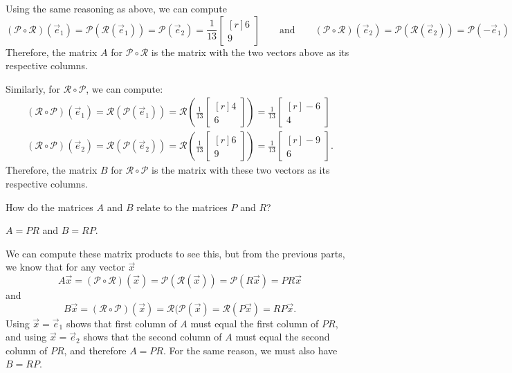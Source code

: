 \documentclass{problemset}
\newcommand{\xhat}{{\vec e_1}}
\newcommand{\yhat}{{\vec e_2}}
\newcommand{\mat}[1]{\begin{bmatrix*}[r]#1\end{bmatrix*}}
\begin{document}
\begin{parts}
\begin{solution}
				Using the same reasoning as above, we can compute
				\[
					(\mathcal P\circ\mathcal R)(\xhat)
					=\mathcal P(\mathcal R(\xhat))
					=\mathcal P(\yhat)
					=\frac{1}{13}\mat{6\\9}
					\qquad \text{and} \qquad
					(\mathcal P\circ\mathcal R)(\yhat)
					=\mathcal P(\mathcal R(\yhat))
					=\mathcal P(-\xhat)
					=\frac{1}{13}\mat{-4\\-6}.
				\]
				Therefore, the matrix $A$ for $\mathcal P\circ\mathcal R$ is the
				matrix with the two vectors above as its respective columns.

				Similarly, for $\mathcal R\circ \mathcal P$, we can compute:
				\begin{gather*}
					(\mathcal R\circ\mathcal P)(\xhat)
					=\mathcal R(\mathcal P(\xhat))
					=\mathcal R\left(\frac{1}{13}\mat{4\\6}\right)
					=\frac{1}{13}\mat{-6\\4} \\
					(\mathcal R\circ\mathcal P)(\yhat)
					=\mathcal R(\mathcal P(\yhat))
					=\mathcal R\left(\frac{1}{13}\mat{6\\9}\right)
					=\frac{1}{13}\mat{-9\\6}.
				\end{gather*}
				Therefore, the matrix $B$ for $\mathcal R\circ\mathcal P$ is the
				matrix with these two vectors as its respective columns.
			\end{solution}
		\item How do the matrices $A$ and $B$ relate to the matrices $P$ and $R$?
			\begin{solution}
				$A = PR$ and $B = RP$.

				We can compute these matrix products to see this, but
				from the previous parts, we know that for any vector $\vec x$
				\[
					A\vec x
					=(\mathcal P\circ\mathcal R)(\vec x)
					=\mathcal P(\mathcal R(\vec x))
					=\mathcal P(R\vec x)
					=PR\vec x
				\]
				and
				\[
					B\vec x
					=(\mathcal R\circ\mathcal P)(\vec x)
					=\mathcal R(\mathcal P(\vec x)
					=\mathcal R(P\vec x)
					=RP\vec x.
				\]
				Using $\vec x = \xhat$ shows that first column of $A$ must equal
				the first column of $PR$, and using $\vec x = \yhat$ shows that
				the second column of $A$ must equal the second column of $PR$,
				and therefore $A = PR$. For the same reason, we must also have $B=RP$.
			\end{solution}

	\end{parts}
\end{document}
